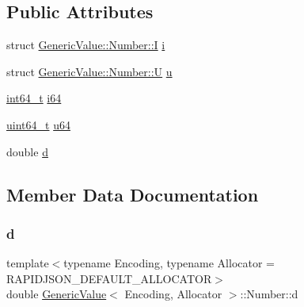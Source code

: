\subsection*{Public Attributes}
\begin{DoxyCompactItemize}
\item 
struct \hyperlink{structGenericValue_1_1Number_1_1I}{Generic\+Value\+::\+Number\+::I} \hyperlink{unionGenericValue_1_1Number_a0593fffc72a240979606668179e94436}{i}
\item 
struct \hyperlink{structGenericValue_1_1Number_1_1U}{Generic\+Value\+::\+Number\+::U} \hyperlink{unionGenericValue_1_1Number_a3b5f0986718c830b88d641491248131d}{u}
\item 
\hyperlink{stdint_8h_a414156feea104f8f75b4ed9e3121b2f6}{int64\+\_\+t} \hyperlink{unionGenericValue_1_1Number_ae53d96a8ead92099541da3b71633b77b}{i64}
\item 
\hyperlink{stdint_8h_aec6fcb673ff035718c238c8c9d544c47}{uint64\+\_\+t} \hyperlink{unionGenericValue_1_1Number_a1c8d3c6d226cf74315e233b30b622430}{u64}
\item 
double \hyperlink{unionGenericValue_1_1Number_a7ca3ad492fff303586d241eb0d17c242}{d}
\end{DoxyCompactItemize}


\subsection{Member Data Documentation}
\mbox{\label{unionGenericValue_1_1Number_a7ca3ad492fff303586d241eb0d17c242}} 
\subsubsection{\texorpdfstring{d}{d}}
{\footnotesize\ttfamily template$<$typename Encoding, typename Allocator = R\+A\+P\+I\+D\+J\+S\+O\+N\+\_\+\+D\+E\+F\+A\+U\+L\+T\+\_\+\+A\+L\+L\+O\+C\+A\+T\+OR$>$ \\
double \hyperlink{classGenericValue}{Generic\+Value}$<$ Encoding, Allocator $>$\+::Number\+::d}

\mbox{\label{unionGenericValue_1_1Number_a0593fffc72a240979606668179e94436}} 
